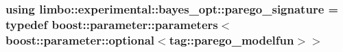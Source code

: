 \subsubsection[{\texorpdfstring{parego\+\_\+signature}{parego_signature}}]{\setlength{\rightskip}{0pt plus 5cm}using {\bf limbo\+::experimental\+::bayes\+\_\+opt\+::parego\+\_\+signature} = typedef boost\+::parameter\+::parameters$<$boost\+::parameter\+::optional$<$tag\+::parego\+\_\+modelfun$>$$>$}\hypertarget{namespacelimbo_1_1experimental_1_1bayes__opt_acbfe5ad9b42be948de5ebb46bdc9dd01}{}\label{namespacelimbo_1_1experimental_1_1bayes__opt_acbfe5ad9b42be948de5ebb46bdc9dd01}
